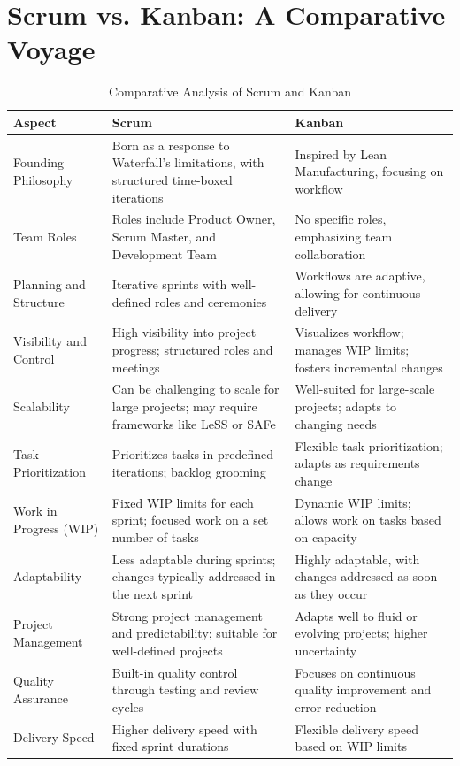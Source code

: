 \documentclass[conference]{IEEEtran}
\begin{document}
\section{Scrum vs. Kanban: A Comparative Voyage}

\begin{table}[htb]
\centering
\caption{Comparative Analysis of Scrum and Kanban}
\label{tab:scrum-kanban-comparison}
\begin{tabular}{|l|p{}|p{}|}
\hline
Aspect & Scrum & Kanban \\
\hline
Founding Philosophy & Born as a response to Waterfall's limitations, with structured time-boxed iterations & Inspired by Lean Manufacturing, focusing on workflow \\
Team Roles & Roles include Product Owner, Scrum Master, and Development Team & No specific roles, emphasizing team collaboration \\
Planning and Structure & Iterative sprints with well-defined roles and ceremonies & Workflows are adaptive, allowing for continuous delivery \\
Visibility and Control & High visibility into project progress; structured roles and meetings & Visualizes workflow; manages WIP limits; fosters incremental changes \\
Scalability & Can be challenging to scale for large projects; may require frameworks like LeSS or SAFe & Well-suited for large-scale projects; adapts to changing needs \\
Task Prioritization & Prioritizes tasks in predefined iterations; backlog grooming & Flexible task prioritization; adapts as requirements change \\
Work in Progress (WIP) & Fixed WIP limits for each sprint; focused work on a set number of tasks & Dynamic WIP limits; allows work on tasks based on capacity \\
Adaptability & Less adaptable during sprints; changes typically addressed in the next sprint & Highly adaptable, with changes addressed as soon as they occur \\
Project Management & Strong project management and predictability; suitable for well-defined projects & Adapts well to fluid or evolving projects; higher uncertainty \\
Quality Assurance & Built-in quality control through testing and review cycles & Focuses on continuous quality improvement and error reduction \\
Delivery Speed & Higher delivery speed with fixed sprint durations & Flexible delivery speed based on WIP limits \\
\hline
\end{tabular}
\end{table}
\end{document}
